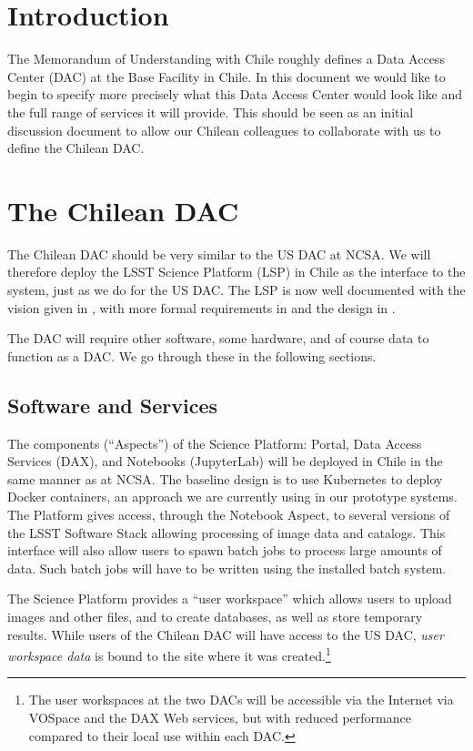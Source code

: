 \section{Introduction}

The Memorandum of Understanding with Chile  roughly defines a Data Access Center (DAC) at the Base Facility in Chile.
In this document we would like to begin to specify more precisely what this Data Access Center would look like and the full range of services it will provide.
This should be seen as an initial discussion document to allow our Chilean colleagues to collaborate with us to define the Chilean DAC.

\section{The Chilean DAC}

The Chilean DAC should be very similar to the US DAC at NCSA.
We will therefore deploy the LSST Science Platform (LSP) in Chile as the interface to the system,
just as we do for the US DAC.
The LSP is now well documented with the vision given in , with more formal requirements in  and the design in .

The DAC will require other software, some  hardware, and of course data to function as a DAC.
We go through these in the following sections.


\subsection{Software and Services}

The components (``Aspects'') of the Science Platform: Portal, Data Access Services (DAX), and Notebooks (JupyterLab) will be deployed in Chile in the same manner as at NCSA.
The baseline design is to use Kubernetes to deploy Docker containers, an approach we are currently using in our prototype systems.
The Platform gives access, through the Notebook Aspect, to several versions of the LSST Software Stack allowing processing of image data and catalogs.
This interface will also allow users to spawn batch jobs to process large amounts of data.
Such batch jobs will have to be written using the installed batch system.

The Science Platform provides a ``user workspace'' which allows users to upload images and other files, and to create databases, as well as store temporary results.
While users of the Chilean DAC will have access to the US DAC, \emph{user workspace data} is bound to the site where it was created.\footnote{The user workspaces at the two DACs will be accessible via the Internet via VOSpace and the DAX Web services, but with reduced performance compared to their local use within each DAC.}

